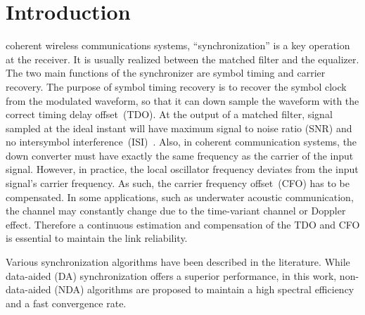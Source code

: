 \documentclass[journal,comsoc]{IEEEtran}
\begin{document}
\section{Introduction}
\label{sec:intro}
 coherent wireless communications systems, ``synchronization'' is a key operation at the receiver.
It is usually realized between the matched filter and the equalizer.
The two main functions of the synchronizer are symbol timing and carrier recovery.
The purpose of symbol timing recovery is to recover the symbol clock from the modulated waveform, so that it can down sample the waveform with the correct timing delay offset~(TDO).
At the output of a matched filter, signal sampled at the ideal instant will have maximum signal to noise ratio (SNR) and no intersymbol interference~(ISI)~\cite{mengali1997synchronization}.
Also, in coherent communication systems, the down converter must have exactly the same frequency as the carrier of the input signal. 
However, in practice, the local oscillator frequency deviates from the input signal's carrier frequency.  
As such, the carrier frequency offset~(CFO) has to be compensated. 
In some applications, such as underwater acoustic communication, the channel may constantly change due to the time-variant channel or Doppler effect. 
Therefore a continuous estimation and compensation of the TDO and CFO is essential to maintain the link reliability.

Various synchronization algorithms have been described in the literature.
While data-aided (DA) synchronization offers a superior performance, in this work, non-data-aided (NDA) algorithms  are proposed to maintain a high spectral efficiency and a fast convergence rate. 




\end{document}

